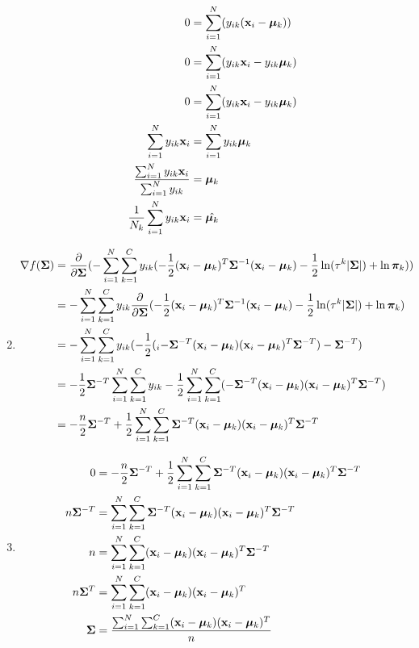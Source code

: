 \documentclass[submit]{harvardml}
\begin{document}
\begin{enumerate}
\begin{equation}
\begin{split}
           0 &= \sum_{i=1}^{N}
            (y_{ik}(\mathbf{x}_i- \boldsymbol{\mu}_k)) \\
            0&= \sum_{i=1}^{N} (y_{ik}\mathbf{x}_i- y_{ik}\boldsymbol{\mu}_k) \\
            0 &= \sum_{i=1}^{N} (y_{ik}\mathbf{x}_i- y_{ik}\boldsymbol{\mu}_k) \\
            \sum_{i=1}^{N}y_{ik}\mathbf{x}_i &= \sum_{i=1}^{N} y_{ik}\boldsymbol{\mu}_k \\
         \frac{\sum_{i=1}^{N}y_{ik}\mathbf{x}_i}{\sum_{i=1}^{N} y_{ik}} &= \boldsymbol{\mu}_k \\ \frac{1}{N_k}\sum_{i=1}^{N}y_{ik}\mathbf{x}_i &= \hat{\boldsymbol{\mu}_k} \\
        \end{split}
    \end{equation}
    \item
    \begin{equation}
        \begin{split}
            \nabla f(\mathbf{\Sigma})&= \frac{\partial}{\partial \mathbf{\Sigma}}(-\sum_{i=1}^{N} \sum_{k=1}^{C} y_{ik} (-\frac{1}{2}(\mathbf{x}_i-\boldsymbol{\mu}_k)^T\mathbf{\Sigma}^{-1}(\mathbf{x}_i-\boldsymbol{\mu}_k)- \frac{1}{2}\ln(\tau^k|\mathbf{\Sigma}|) + \ln \boldsymbol{\pi}_k)) \\
            &= -\sum_{i=1}^{N} \sum_{k=1}^{C} y_{ik}\frac{\partial}{\partial \mathbf{\Sigma}} (-\frac{1}{2}(\mathbf{x}_i-\boldsymbol{\mu}_k)^T\mathbf{\Sigma}^{-1}(\mathbf{x}_i-\boldsymbol{\mu}_k)- \frac{1}{2}\ln(\tau^k|\mathbf{\Sigma}|) + \ln \boldsymbol{\pi}_k) \\
            &= -\sum_{i=1}^{N} \sum_{k=1}^{C} y_{ik} (-\frac{1}{2}(_i-\mathbf{\Sigma}^{-T}(\mathbf{x}_i-\boldsymbol{\mu}_k)(\mathbf{x}_i-\boldsymbol{\mu}_k)^T\mathbf{\Sigma}^{-T}) - \mathbf{\Sigma}^{-T})\\
            &= -\frac{1}{2}\mathbf{\Sigma}^{-T} \sum_{i=1}^{N} \sum_{k=1}^{C} y_{ik} -\frac{1}{2}\sum_{i=1}^{N} \sum_{k=1}^{C}(-\mathbf{\Sigma}^{-T}(\mathbf{x}_i-\boldsymbol{\mu}_k)(\mathbf{x}_i-\boldsymbol{\mu}_k)^T\mathbf{\Sigma}^{-T})\\
            &= -\frac{n}{2}\mathbf{\Sigma}^{-T} +\frac{1}{2}\sum_{i=1}^{N} \sum_{k=1}^{C}\mathbf{\Sigma}^{-T}(\mathbf{x}_i-\boldsymbol{\mu}_k)(\mathbf{x}_i-\boldsymbol{\mu}_k)^T\mathbf{\Sigma}^{-T}\\
        \end{split}
    \end{equation}
    \item
    \begin{equation}
        \begin{split}
            0 &= -\frac{n}{2}\mathbf{\Sigma}^{-T} +\frac{1}{2}\sum_{i=1}^{N} \sum_{k=1}^{C}\mathbf{\Sigma}^{-T}(\mathbf{x}_i-\boldsymbol{\mu}_k)(\mathbf{x}_i-\boldsymbol{\mu}_k)^T\mathbf{\Sigma}^{-T}\\
            n\mathbf{\Sigma}^{-T} &=\sum_{i=1}^{N} \sum_{k=1}^{C}\mathbf{\Sigma}^{-T}(\mathbf{x}_i-\boldsymbol{\mu}_k)(\mathbf{x}_i-\boldsymbol{\mu}_k)^T\mathbf{\Sigma}^{-T}\\
            n &=\sum_{i=1}^{N} \sum_{k=1}^{C}(\mathbf{x}_i-\boldsymbol{\mu}_k)(\mathbf{x}_i-\boldsymbol{\mu}_k)^T\mathbf{\Sigma}^{-T}\\
            n\mathbf{\Sigma}^{T} &=\sum_{i=1}^{N} \sum_{k=1}^{C}(\mathbf{x}_i-\boldsymbol{\mu}_k)(\mathbf{x}_i-\boldsymbol{\mu}_k)^T\\
            \mathbf{\Sigma} &= \frac{\sum_{i=1}^{N} \sum_{k=1}^{C}(\mathbf{x}_i-\boldsymbol{\mu}_k)(\mathbf{x}_i-\boldsymbol{\mu}_k)^T}{n}\\
        \end{split}
    \end{equation}
\end{enumerate}
\end{document}
